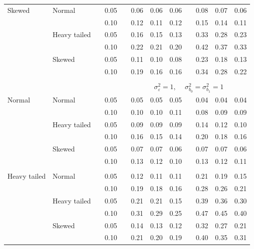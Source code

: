 \documentclass[12pt]{article} %
\begin{document}
\begin{table}[ht]
\begin{scriptsize}
\begin{center}
\begin{tabular}{ll p{.1cm} c p{.1cm} rrr p{.1cm} rrr}
Skewed       & Normal       && 0.05 &&  0.06 & 0.06 & 0.06 && 0.08 & 0.07 & 0.06 \\ 
             &              && 0.10 &&  0.12 & 0.11 & 0.12 && 0.15 & 0.14 & 0.11 \\ 
             & Heavy tailed && 0.05 &&  0.16 & 0.15 & 0.13 && 0.33 & 0.28 & 0.23 \\ 
             &              && 0.10 &&  0.22 & 0.21 & 0.20 && 0.42 & 0.37 & 0.33 \\ 
             & Skewed       && 0.05 &&  0.11 & 0.10 & 0.08 && 0.23 & 0.18 & 0.13 \\ 
             &              && 0.10 &&  0.19 & 0.16 & 0.16 && 0.34 & 0.28 & 0.22 \\ 

&&&&&&&&&&&\\
& && && \multicolumn{7}{c}{$\sigma_{\varepsilon}^2 = 1$, \ \ $\sigma_{b_0}^2 = \sigma_{b_1}^2 = 1$} \\ \cline{6-12}
\rowcolor{gray!20}Normal       & Normal       && 0.05 &&  0.05 & 0.05 & 0.05 && 0.04 & 0.04 & 0.04 \\ 
\rowcolor{gray!20}             &              && 0.10 &&  0.10 & 0.10 & 0.11 && 0.08 & 0.09 & 0.09 \\ 
\rowcolor{gray!20}             & Heavy tailed && 0.05 &&  0.09 & 0.09 & 0.09 && 0.14 & 0.12 & 0.10 \\ 
\rowcolor{gray!20}             &              && 0.10 &&  0.16 & 0.15 & 0.14 && 0.20 & 0.18 & 0.16 \\ 
\rowcolor{gray!20}             & Skewed       && 0.05 &&  0.07 & 0.07 & 0.06 && 0.07 & 0.07 & 0.06 \\ 
\rowcolor{gray!20}             &              && 0.10 &&  0.13 & 0.12 & 0.10 && 0.13 & 0.12 & 0.11 \\ 
             &&&&&&&&&&&\\
Heavy tailed & Normal       && 0.05 &&  0.12 & 0.11 & 0.11 && 0.21 & 0.19 & 0.15 \\ 
             &              && 0.10 &&  0.19 & 0.18 & 0.16 && 0.28 & 0.26 & 0.21 \\ 
             & Heavy tailed && 0.05 &&  0.21 & 0.21 & 0.15 && 0.39 & 0.36 & 0.30 \\ 
             &              && 0.10 &&  0.31 & 0.29 & 0.25 && 0.47 & 0.45 & 0.40 \\ 
             & Skewed       && 0.05 &&  0.14 & 0.13 & 0.12 && 0.32 & 0.27 & 0.21 \\ 
             &              && 0.10 &&  0.21 & 0.20 & 0.19 && 0.40 & 0.35 & 0.31 \\ 

\end{tabular}
\end{center}
\end{scriptsize}
\end{table}
\end{document}
